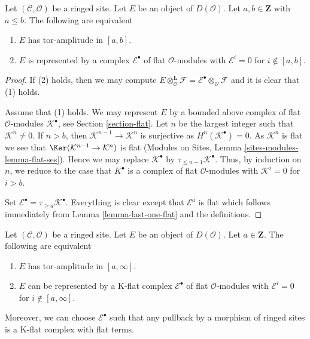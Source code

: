 \begin{lemma}
\label{lemma-tor-amplitude}
Let $(\mathcal{C}, \mathcal{O})$ be a ringed site. Let $E$ be an object of
$D(\mathcal{O})$. Let $a, b \in \mathbf{Z}$ with $a \leq b$. The following
are equivalent
\begin{enumerate}
\item $E$ has tor-amplitude in $[a, b]$.
\item $E$ is represented by a complex
$\mathcal{E}^\bullet$ of flat $\mathcal{O}$-modules with
$\mathcal{E}^i = 0$ for $i \not \in [a, b]$.
\end{enumerate}
\end{lemma}

\begin{proof}
If (2) holds, then we may compute
$E \otimes_\mathcal{O}^\mathbf{L} \mathcal{F} =
\mathcal{E}^\bullet \otimes_\mathcal{O} \mathcal{F}$
and it is clear that (1) holds.

\medskip\noindent
Assume that (1) holds. We may represent $E$ by a bounded above complex
of flat $\mathcal{O}$-modules $\mathcal{K}^\bullet$, see
Section \ref{section-flat}.
Let $n$ be the largest integer such that $\mathcal{K}^n \not = 0$.
If $n > b$, then $\mathcal{K}^{n - 1} \to \mathcal{K}^n$ is surjective as
$H^n(\mathcal{K}^\bullet) = 0$. As $\mathcal{K}^n$ is flat we see that
$\Ker(\mathcal{K}^{n - 1} \to \mathcal{K}^n)$ is flat
(Modules on Sites, Lemma \ref{sites-modules-lemma-flat-ses}).
Hence we may replace $\mathcal{K}^\bullet$ by
$\tau_{\leq n - 1}\mathcal{K}^\bullet$. Thus, by induction on $n$, we
reduce to the case that $K^\bullet$ is a complex of flat
$\mathcal{O}$-modules with $\mathcal{K}^i = 0$ for $i > b$.

\medskip\noindent
Set $\mathcal{E}^\bullet = \tau_{\geq a}\mathcal{K}^\bullet$.
Everything is clear except that $\mathcal{E}^a$ is flat
which follows immediately from Lemma \ref{lemma-last-one-flat}
and the definitions.
\end{proof}

\begin{lemma}
\label{lemma-bounded-below-tor-amplitude}
Let $(\mathcal{C}, \mathcal{O})$ be a ringed site. Let $E$ be an object of
$D(\mathcal{O})$. Let $a \in \mathbf{Z}$. The following
are equivalent
\begin{enumerate}
\item $E$ has tor-amplitude in $[a, \infty]$.
\item $E$ can be represented by a K-flat complex $\mathcal{E}^\bullet$
of flat $\mathcal{O}$-modules with $\mathcal{E}^i = 0$ for
$i \not \in [a, \infty]$.
\end{enumerate}
Moreover, we can choose $\mathcal{E}^\bullet$ such that any pullback
by a morphism of ringed sites is a K-flat complex with flat terms.
\end{lemma}

